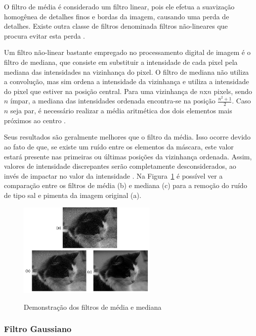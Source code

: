 \documentclass[12pt,oneside,a4paper,english,french,spanish,brazil,]{abntex2}
\begin{document}
O filtro de média é considerado um filtro linear, pois ele efetua a suavização homogênea de detalhes finos e bordas da imagem, causando uma perda de detalhes. Existe outra classe de filtros denominada filtros não-lineares que procura evitar esta perda \cite{pedrini:2008}.

Um filtro não-linear bastante empregado no processamento digital de imagem é o filtro de mediana, que consiste em substituir a intensidade de cada pixel pela mediana das intensidades na vizinhança do pixel. O filtro de mediana não utiliza a convolução, mas sim ordena a intensidade da vizinhança e utiliza a intensidade do pixel que estiver na posição central. Para uma vizinhança de \(n\)x\(n\) pixels, sendo \(n\) ímpar, a mediana das intensidades ordenada encontra-se na posição \(\frac{n^2+1}{2}\). Caso \(n\) seja par, é necessário realizar a média aritmética dos dois elementos mais próximos ao centro \cite{gonzalez:2012}. 

Seus resultados são geralmente melhores que o filtro da média. Isso ocorre devido ao fato de que, se existe um ruído entre os elementos da máscara, este valor estará presente nas primeiras ou últimas posições da vizinhança ordenada. Assim, valores de intensidade discrepantes serão completamente desconsiderados, ao invés de impactar no valor da intensidade \cite{conci:2003}. Na Figura~\ref{fig:PDI_Media_Mediana} é possível ver a comparação entre os filtros de média (b) e mediana (c) para a remoção do ruído de tipo sal e pimenta da imagem original (a).

\begin{figure}[ht]
\centering
\caption{ Demonstração dos filtros de média e mediana}
\includegraphics[width=0.6\textwidth]{imagens/PDI_Media_Mediana.pdf}
\sourceAuthor
\label{fig:PDI_Media_Mediana}
\end{figure}

\subsubsection{Filtro Gaussiano}
\end{document}
